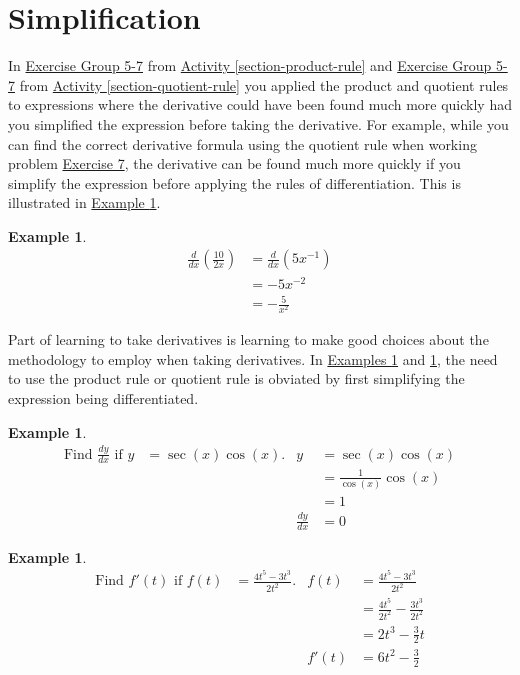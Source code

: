 \documentclass[12pt,]{book}
\theoremstyle{plain}
\theoremstyle{definition}
\newtheorem{example}[theorem]{Example}
\numberwithin{equation}{section}
\newcommand{\fe}[2]{#1\mathopen{}\left(#2\right)\mathclose{}}
\newcommand{\fd}[1]{#1'}
\newcommand{\lz}[2]{\frac{d#1}{d#2}}
\newcommand{\lzoo}[2]{{\frac{d}{d#1}}{\left(#2\right)}}
\begin{document}
\section[Simplification]{Simplification}\label{section-simplification}
In \hyperlink{exercisegroup-unsimplified-product}{Exercise Group 5-7} from \hyperref[section-product-rule]{Activity \ref{section-product-rule}} and \hyperlink{exercisegroup-unsimplified-quotient}{Exercise Group 5-7} from \hyperref[section-quotient-rule]{Activity \ref{section-quotient-rule}} you applied the product and quotient rules to expressions where the derivative could have been found much more quickly had you simplified the expression before taking the derivative.  For example, while you can find the correct derivative formula using the quotient rule when working problem \hyperlink{unsimplified-quotient-last}{Exercise 7}, the derivative can be found much more quickly if you simplify the expression before applying the rules of differentiation. This is illustrated in \hyperref[example-simplify-first]{Example \ref{example-simplify-first}}.%
\begin{example}\label{example-simplify-first}
\begin{align*}
\lzoo{x}{\frac{10}{2x}}&=\lzoo{x}{5x^{-1}}\\
&=-5x^{-2}\\
&=-\frac{5}{x^{2}}
\end{align*}%
\end{example}
\par
Part of learning to take derivatives is learning  to make good choices about the methodology to employ when taking derivatives.  In \hyperref[example-simplify-second]{Examples \ref{example-simplify-second}} and \hyperref[example-simplify-third]{\ref{example-simplify-third}}, the need to use the product rule or quotient rule is obviated by first simplifying the expression being differentiated.%
\begin{example}\label{example-simplify-second}
\begin{align*}
\text{Find }\lz{y}{x}\text{ if }y&=\fe{\sec}{x}\fe{\cos}{x}\text{.}&y&=\fe{\sec}{x}\fe{\cos}{x}\\
&&&=\frac{1}{\fe{\cos}{x}}\fe{\cos}{x}\\
&&&=1\\
&&\lz{y}{x}&=0
\end{align*}%
\end{example}
\begin{example}\label{example-simplify-third}
\begin{align*}
\text{Find }\fe{\fd{f}}{t}\text{ if }\fe{f}{t}&=\frac{4t^5-3t^3}{2t^2}\text{.}&\fe{f}{t}&=\frac{4t^5-3t^3}{2t^2}\\
&&&=\frac{4t^5}{2t^2}-\frac{3t^3}{2t^2}\\
&&&=2t^3-\frac{3}{2}t\\
&&\fe{\fd{f}}{t}&=6t^2-\frac{3}{2}
\end{align*}%
\end{example}
\typeout{************************************************}
\typeout{************************************************}
\end{document}

